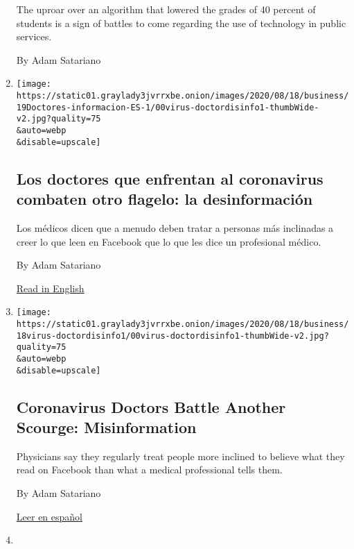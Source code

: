 \begin{enumerate}
  The uproar over an algorithm that lowered the grades of 40 percent of
  students is a sign of battles to come regarding the use of technology
  in public services.

  By Adam Satariano
\item
  \href{/es/2020/08/20/espanol/ciencia-y-tecnologia/desinformacion-coronavirus.html}{}

  \texttt{[image: https://static01.graylady3jvrrxbe.onion/images/2020/08/18/business/19Doctores-informacion-ES-1/00virus-doctordisinfo1-thumbWide-v2.jpg?quality=75\\\&auto=webp\\\&disable=upscale]}

  \hypertarget{los-doctores-que-enfrentan-al-coronavirus-combaten-otro-flagelo-la-desinformaciuxf3n}{%
  \subsection{Los doctores que enfrentan al coronavirus combaten otro
  flagelo: la
  desinformación}\label{los-doctores-que-enfrentan-al-coronavirus-combaten-otro-flagelo-la-desinformaciuxf3n}}

  Los médicos dicen que a menudo deben tratar a personas más inclinadas
  a creer lo que leen en Facebook que lo que les dice un profesional
  médico.

  By Adam Satariano

  \href{https://www.nytimes3xbfgragh.onion/2020/08/17/technology/coronavirus-disinformation-doctors.html}{Read
  in English}
\item
  \href{/2020/08/17/technology/coronavirus-disinformation-doctors.html}{}

  \texttt{[image: https://static01.graylady3jvrrxbe.onion/images/2020/08/18/business/18virus-doctordisinfo1/00virus-doctordisinfo1-thumbWide-v2.jpg?quality=75\\\&auto=webp\\\&disable=upscale]}

  \hypertarget{coronavirus-doctors-battle-another-scourge-misinformation}{%
  \subsection{Coronavirus Doctors Battle Another Scourge:
  Misinformation}\label{coronavirus-doctors-battle-another-scourge-misinformation}}

  Physicians say they regularly treat people more inclined to believe
  what they read on Facebook than what a medical professional tells
  them.

  By Adam Satariano

  \href{https://www.nytimes3xbfgragh.onion/es/2020/08/20/espanol/ciencia-y-tecnologia/desinformacion-coronavirus.html}{Leer
  en español}
\item
  \href{/2020/08/04/business/google-fitbit-europe.html}{}


\end{enumerate}
